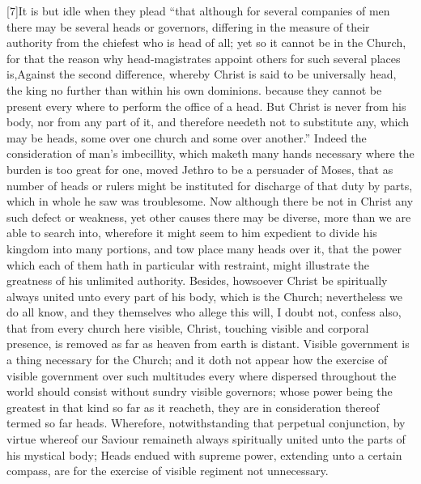[7]It is but idle when they plead “that although for several companies of men there may be several heads or governors, differing in the measure of their authority from the chiefest who is head of all; yet so it cannot be in the Church, for that the reason why head-magistrates appoint others for such several places is,Against the second difference, whereby Christ is said to be universally head, the king no further than within his own dominions. because they cannot be present every where to perform the office of a head. But Christ is never from his body, nor from any part of it, and therefore needeth not to substitute any, which may be heads, some over one church and some over another.” Indeed the consideration of man’s imbecillity, which maketh many hands necessary where the burden is too great for one, moved Jethro to be a persuader of Moses, that as number of heads or rulers might be instituted for discharge of that duty by parts, which in whole he saw was troublesome. Now although there be not in Christ any such defect or weakness, yet other causes there may be diverse, more than we are able to search into, wherefore it might seem to him expedient to divide his kingdom into many portions, and tow place many heads over it, that the power which each of them hath in particular with restraint, might illustrate the greatness of his unlimited authority. Besides, howsoever Christ be spiritually always united unto every part of his body, which is the Church; nevertheless we do all know, and they themselves who allege this will, I doubt not, confess also, that from every church here visible, Christ, touching visible and corporal presence, is removed as far as heaven from earth is distant. Visible government is a thing necessary for the Church; and it doth not appear how the exercise of visible government over such multitudes every where dispersed throughout the world should consist without sundry visible governors; whose power being the greatest in that kind so far as it reacheth, they are in consideration thereof termed so far heads. Wherefore, notwithstanding that perpetual conjunction, by virtue whereof our Saviour remaineth always spiritually united unto the parts of his mystical body; Heads endued with supreme power, extending unto a certain compass, are for the exercise of visible regiment not unnecessary.


